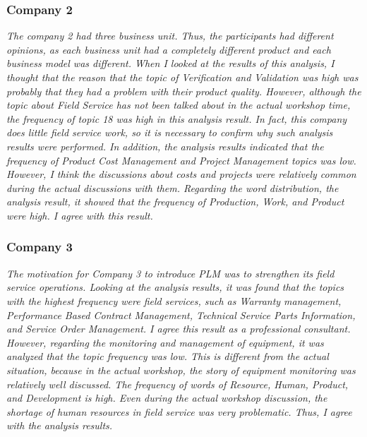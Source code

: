 \documentclass[10pt, conference, compsocconf]{IEEEtran}
\begin{document}
\subsubsection{Company 2}
{\it The company 2 had three business unit. Thus, the participants had different opinions, as each business unit had a completely different product and each business model was different. When I looked at the results of this analysis, I thought that the reason that the topic of Verification and Validation was high was probably that they had a problem with their product quality. However, although the topic about Field Service has not been talked about in the actual workshop time, the frequency of topic 18 was high in this analysis result. In fact, this company does little field service work, so it is necessary to confirm why such analysis results were performed. In addition, the analysis results indicated that the frequency of Product Cost Management and Project Management topics was low. However, I think the discussions about costs and projects were relatively common during the actual discussions with them. Regarding the word distribution, the analysis result, it showed that the frequency of Production, Work, and Product were high. I agree with this result.}
\smallskip

\subsubsection{Company 3}
{\it The motivation for Company 3 to introduce PLM was to strengthen its field service operations. Looking at the analysis results, it was found that the topics with the highest frequency were field services, such as Warranty management, Performance Based Contract Management, Technical Service Parts Information, and Service Order Management. I agree this result as a professional consultant. However, regarding the monitoring and management of equipment, it was analyzed that the topic frequency was low. This is different from the actual situation, because in the actual workshop, the story of equipment monitoring was relatively well discussed. The frequency of words of Resource, Human, Product, and Development is high. Even during the actual workshop discussion, the shortage of human resources in field service was very problematic. Thus, I agree with the analysis results.}
\smallskip
\end{document}
